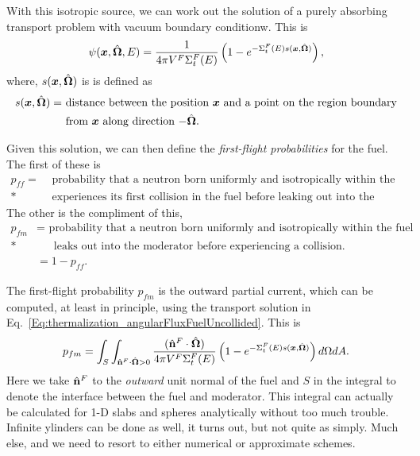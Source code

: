 With this isotropic source, we can work out the solution of a purely absorbing transport problem with vacuum boundary conditionw. This is
\begin{align}
  \psi(\bm{x},\hat{\mathbf{\Omega}},E) = \frac{1}{4\pi V^F \Sigma_t^F(E)} \left( 1 - e^{-\Sigma_t^F(E) s(\bm{x},\hat{\mathbf{\Omega}})} \right) , \label{Eq:thermalization_angularFluxFuelUncollided}
\end{align}
where, $s(\bm{x},\hat{\mathbf{\Omega}})$ is is defined as
\begin{align}
  s(\bm{x},\hat{\mathbf{\Omega}}) = 	&\text{ distance between the position $\bm{x}$ and a point on the region boundary} \nonumber \\*
  					&\text{ from $\bm{x}$ along direction $-\hat{\mathbf{\Omega}}$.} \nonumber
\end{align}

Given this solution, we can then define the \emph{first-flight probabilities} for the fuel. The first of these is
\begin{align}
  p_{ff} = 	&\text{ probability that a neutron born uniformly and isotropically within the fuel} \nonumber \\*
  			&\text{ experiences its first collision in the fuel before leaking out into the moderator.} \nonumber
\end{align}
The other is the compliment of this,
\begin{align}
  p_{fm} &= \text{ probability that a neutron born uniformly and isotropically within the fuel} \nonumber \\*
  		 &\quad \ 	\text{ leaks out into the moderator before experiencing a collision.} \nonumber \\
		 &= 1 - p_{ff}.	\nonumber
\end{align}

The first-flight probability $p_{fm}$ is the outward partial current, which can be computed, at least in principle, using the transport solution in Eq.~\eqref{Eq:thermalization_angularFluxFuelUncollided}. This is
\begin{align}
  p_{fm} = \int_{S} \int_{\hat{\mathbf{n}}^F \cdot \hat{\mathbf{\Omega}} > 0}  \frac{( \hat{\mathbf{n}}^F \cdot \hat{\mathbf{\Omega}} )}{4\pi V^F \Sigma_t^F(E)} \left( 1 - e^{-\Sigma_t^F(E) s(\bm{x},\hat{\mathbf{\Omega}})} \right) d\Omega dA. \label{Eq:thermalization_uncollidedUniformIsotropicFuelAngularFlux}
\end{align}
Here we take $\hat{\mathbf{n}}^F$ to the \emph{outward} unit normal of the fuel and $S$ in the integral to denote the interface between the fuel and moderator. This integral can actually be calculated for 1-D slabs and spheres analytically without too much trouble. Infinite ylinders can be done as well, it turns out, but not quite as simply. Much else, and we need to resort to either numerical or approximate schemes.

